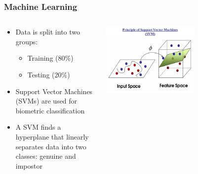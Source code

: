 \documentclass{beamer}
\begin{document}
\begin{frame}
\frametitle{Machine Learning}
 \begin{columns}
  \begin{column}{.65\textwidth}
  \begin{itemize}
  		\item Data is split into two groups:
  			\begin{itemize}
  				\item Training (80\%)
  				\item Testing (20\%)
  				\linebreak
  			\end{itemize}
		\item Support Vector Machines (SVMs) are used for biometric classification
		\linebreak
		\item A SVM finds a hyperplane that linearly separates data into two classes: genuine and impostor
  \end{itemize}
  \end{column}
  \begin{column}{0.6\textwidth}
   \includegraphics[width=0.6\textwidth]{Illustrations/svm.jpg}
       \\
  \end{column}
  \end{columns}  
\end{frame}
\end{document}
